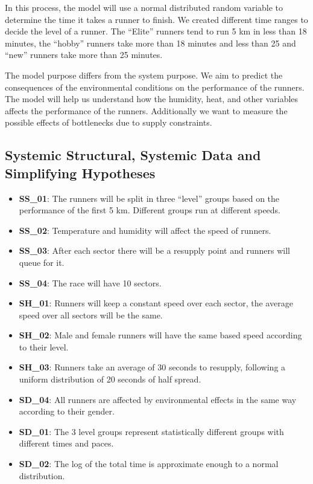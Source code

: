 \documentclass[conference]{IEEEtran}
\begin{document}
In this process, the model will use a normal distributed random variable to determine the time it takes a runner to finish. We created different time ranges to decide the level of a runner. The ``Elite'' runners tend to run 5 km in less than 18 minutes, the ``hobby'' runners take more than 18 minutes and less than 25 and ``new'' runners take more than 25 minutes.

The model purpose differs from the system purpose. We aim to predict the consequences of the environmental conditions on the performance of the runners. The model will help us understand how the humidity, heat, and other variables affects the performance of the runners. Additionally we want to measure the possible effects of bottlenecks due to supply constraints.



\subsection{Systemic Structural, Systemic Data and Simplifying Hypotheses}

\begin{itemize}
    \item \textbf{SS\_01}: The runners will be split in three ``level'' groups based on the performance of the first 5 km. Different groups run at different speeds.
    \item \textbf{SS\_02}: Temperature and humidity will affect the speed of runners.
    \item \textbf{SS\_03}: After each sector there will be a resupply point and runners will queue for it.
    \item \textbf{SS\_04}: The race will have 10 sectors.
    \item \textbf{SH\_01}: Runners will keep a constant speed over each sector, the average speed over all sectors will be the same.
    \item \textbf{SH\_02}: Male and female runners will have the same based speed according to their level.
    \item \textbf{SH\_03}: Runners take an average of 30 seconds to resupply, following a uniform distribution of 20 seconds of half spread.
    \item \textbf{SD\_04}: All runners are affected by environmental effects in the same way according to their gender.
    \item \textbf{SD\_01}: The 3 level groups represent statistically different groups with different times and paces.
    \item \textbf{SD\_02}: The log of the total time is approximate enough to a normal distribution.
\end{itemize}
\end{document}
